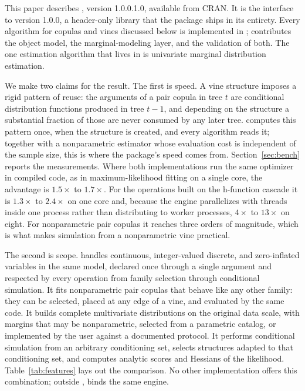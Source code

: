 \documentclass[article]{jss}
\newcommand{\pkgversion}{1.0.0.1.0}
\newcommand{\vcldversion}{1.0.0}
\begin{document}
This paper describes , version \pkgversion, available from
CRAN.  It is the  interface to  version
\vcldversion, a header-only  library that the package ships in
its entirety.  Every algorithm for copulas and vines discussed below is
implemented in ;  contributes the
 object model, the marginal-modeling layer, and the validation of
both.  The one estimation algorithm that lives in  is univariate
marginal distribution estimation.

We make two claims for the result.  The first is speed.  A vine structure
imposes a rigid pattern of reuse: the arguments of a pair copula in tree $t$
are conditional distribution functions produced in tree $t-1$, and depending
on the structure a substantial fraction of those are never consumed by any
later tree.   computes this pattern once, when the structure
is created, and every algorithm reads it; together with a nonparametric
estimator whose evaluation cost is independent of the sample size, this is
where the package's speed comes from.  Section~\ref{sec:bench} reports the
measurements.  Where both implementations run the same optimizer in compiled
code, as in maximum-likelihood fitting on a single core, the advantage is
$1.5\times$ to $1.7\times$.  For the operations built on the h-function
cascade it is $1.3\times$ to $2.4\times$ on one core and, because the engine
parallelizes with threads inside one process rather than distributing to
worker processes, $4\times$ to $13\times$ on eight.  For nonparametric pair
copulas it reaches three orders of magnitude, which is what makes simulation
from a nonparametric vine practical.

The second is scope.   handles continuous, integer-valued discrete, and
zero-inflated variables in the same model, declared once through a single
 argument and respected by every operation from family
selection through conditional simulation.  It fits nonparametric pair copulas that behave
like any other family: they can be selected, placed at any edge of a vine, and
evaluated by the same code.
It builds complete multivariate distributions on the original data scale, with
margins that may be nonparametric, selected from a parametric catalog, or
implemented by the user against a documented protocol.  It performs conditional
simulation from an arbitrary conditioning set, selects structures adapted to
that conditioning set, and computes analytic scores and Hessians of the
likelihood.  Table~\ref{tab:features} lays out the comparison.  No other 
implementation offers this combination; outside ,
 \citep{pyvinecopulib} binds the same engine.
\end{document}
